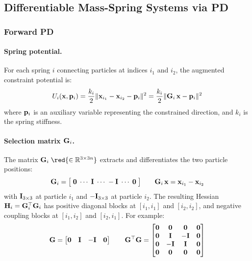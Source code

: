 \subsection{Differentiable Mass-Spring Systems via PD}

\subsubsection{Forward PD}

\paragraph{Spring potential.}
For each spring $i$ connecting particles at indices $i_1$ and $i_2$, the augmented constraint potential is:
\begin{equation}
    U_i(\mathbf{x}, \mathbf{p}_i) = \frac{k_i}{2} \| \mathbf{x}_{i_1} - \mathbf{x}_{i_2} - \mathbf{p}_i \|^2 = \frac{k_i}{2} \| \mathbf{G}_i\,\mathbf{x} - \mathbf{p}_i \|^2
\end{equation}
where $\mathbf{p}_i$ is an auxiliary variable representing the constrained direction, and $k_i$ is the spring stiffness.

\paragraph{Selection matrix $\mathbf{G}_i$.}
The matrix $\G_i\; \red{\in \RR^{3 \times 3n}}$ extracts and differentiates the two particle positions:
\begin{equation*}
    \mathbf{G}_i = \big[\;\mathbf{0} \;\cdots\; \mathbf{I} \;\cdots\; -\mathbf{I} \;\cdots\; \mathbf{0}\;\big]
    \qquad
    \mathbf{G}_i\,\mathbf{x} = \mathbf{x}_{i_1} - \mathbf{x}_{i_2}
\end{equation*}
with $\mathbf{I}_{3 \times 3}$ at particle $i_1$ and $-\mathbf{I}_{3 \times 3}$ at particle $i_2$. The resulting Hessian $\mathbf{H}_i = \mathbf{G}_i^\top\mathbf{G}_i$ has positive diagonal blocks at $[i_1,i_1]$ and $[i_2,i_2]$, and negative coupling blocks at $[i_1,i_2]$ and $[i_2,i_1]$.
\newline For example:
\begin{equation*}
    \mathbf{G} = 
    \begin{bmatrix}
        \mathbf{0} &\mathbf{I} &-\mathbf{I} &\mathbf{0}
    \end{bmatrix}
    \qquad
    \mathbf{G}^\top\mathbf{G} = 
    \begin{bmatrix}
        \mathbf{0} &\mathbf{0} & \mathbf{0} &\mathbf{0} \\
        \mathbf{0} &\mathbf{I} &-\mathbf{I} &\mathbf{0} \\
        \mathbf{0} &-\mathbf{I} &\mathbf{I} &\mathbf{0} \\
        \mathbf{0} &\mathbf{0} & \mathbf{0} &\mathbf{0} \\
    \end{bmatrix}
\end{equation*}

